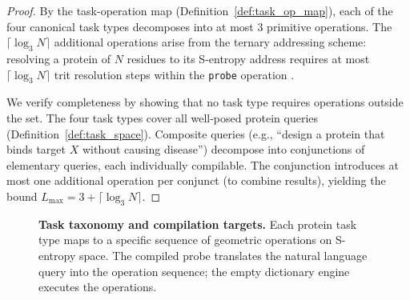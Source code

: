 \documentclass[11pt,twocolumn,a4paper]{article}
\theoremstyle{definition}
\theoremstyle{remark}
\begin{document}
\begin{proof}
By the task-operation map (Definition~\ref{def:task_op_map}), each of the four canonical task types decomposes into at most 3 primitive operations. The $\lceil \log_3 N \rceil$ additional operations arise from the ternary addressing scheme: resolving a protein of $N$ residues to its S-entropy address requires at most $\lceil \log_3 N \rceil$ trit resolution steps within the \texttt{probe} operation \citep{sachikonye2025d}.

We verify completeness by showing that no task type requires operations outside the set. The four task types cover all well-posed protein queries (Definition~\ref{def:task_space}). Composite queries (e.g., ``design a protein that binds target $X$ without causing disease'') decompose into conjunctions of elementary queries, each individually compilable. The conjunction introduces at most one additional operation per conjunct (to combine results), yielding the bound $L_{\max} = 3 + \lceil \log_3 N \rceil$.
\end{proof}

\begin{figure}[!htbp]
\centering
{}
\caption{\textbf{Task taxonomy and compilation targets.} Each protein task type maps to a specific sequence of geometric operations on S-entropy space. The compiled probe translates the natural language query into the operation sequence; the empty dictionary engine executes the operations.}
\label{fig:task_taxonomy}
\end{figure}
\end{document}
